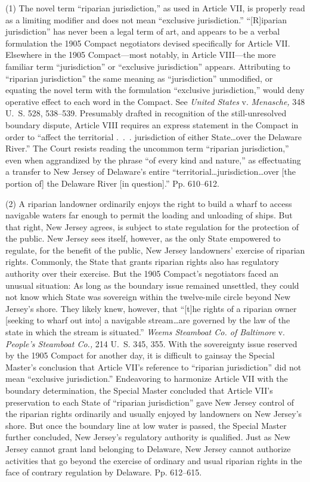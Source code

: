   (1) The novel term ``riparian jurisdiction,'' as used in Article
VII, is properly read as a limiting modifier and does not mean
``exclusive jurisdiction.'' ``[R]iparian jurisdiction'' has never
been a legal term of art, and appears to be a verbal formulation
the 1905 Compact negotiators devised specifically for Article VII.
Elsewhere in the 1905 Compact---most notably, in Article VIII---the
more familiar term ``jurisdiction'' or ``exclusive jurisdiction''
appears. Attributing to ``riparian jurisdiction'' the same meaning
as ``jurisdiction'' unmodified, or equating the novel term with the
formulation ``exclusive jurisdiction,'' would deny operative effect
to each word in the Compact. See \emph{United States} v. \emph{Menasche,}
348 U.~S. 528, 538--539. Presumably drafted in recognition of the
still-unresolved boundary dispute, Article VIII requires an express
statement in the Compact in order to ``affect the territorial .~.~.
jurisdiction of either State\dots over the Delaware River.'' The
Court resists reading the uncommon term ``riparian jurisdiction,''
even when aggrandized by the phrase ``of every kind and nature,''
as effectuating a transfer to New Jersey of Delaware's entire
``territorial\dots jurisdiction\dots over [the portion of] the
Delaware River [in question].'' Pp. 610--612.

  (2) A riparian landowner ordinarily enjoys the right to build a
wharf to access navigable waters far enough to permit the loading and
unloading of ships. But that right, New Jersey agrees, is subject to
state regulation for the protection of the public. New Jersey sees
itself, however, as the only State empowered to regulate, for the
benefit of the public, New Jersey landowners' exercise of riparian
rights. Commonly, the State that grants riparian rights also has
regulatory authority over their exercise. But the 1905 Compact's
negotiators faced an unusual situation: As long as the boundary issue
remained unsettled, they could not know which State was sovereign within
the twelve-mile circle be\newpage yond New Jersey's shore. They likely
knew, however, that ``[t]he rights of a riparian owner [seeking to
wharf out into] a navigable stream\dots are governed by the law of
the state in which the stream is situated.'' \emph{Weems Steamboat Co.
of Baltimore} v. \emph{People's Steamboat Co.,} 214 U.~S. 345, 355.
With the sovereignty issue reserved by the 1905 Compact for another
day, it is difficult to gainsay the Special Master's conclusion that
Article VII's reference to ``riparian jurisdiction'' did not mean
``exclusive jurisdiction.'' Endeavoring to harmonize Article VII with
the boundary determination, the Special Master concluded that Article
VII's preservation to each State of ``riparian jurisdiction'' gave
New Jersey control of the riparian rights ordinarily and usually enjoyed
by landowners on New Jersey's shore. But once the boundary line at low
water is passed, the Special Master further concluded, New Jersey's
regulatory authority is qualified. Just as New Jersey cannot grant land
belonging to Delaware, New Jersey cannot authorize activities that go
beyond the exercise of ordinary and usual riparian rights in the face of
contrary regulation by Delaware. Pp. 612--615.

